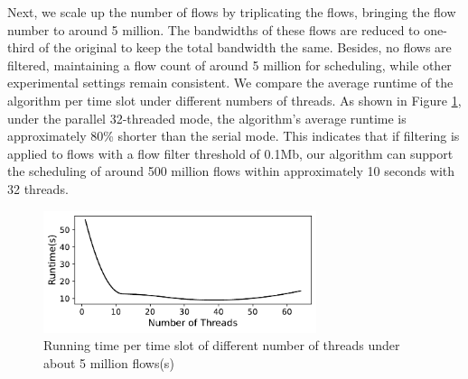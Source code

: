 Next, we scale up the number of flows by triplicating the flows, bringing the flow number to around 5 million. The bandwidths of these flows are reduced to one-third of the original to keep the total bandwidth the same. Besides, no flows are filtered, maintaining a flow count of around 5 million for scheduling, while other experimental settings remain consistent. We compare the average runtime of the algorithm per time slot under different numbers of threads. As shown in Figure \ref{fig:runtimeComp}, under the parallel 32-threaded mode, the algorithm's average runtime is approximately 80\% shorter than the serial mode. This indicates that if filtering is applied to flows with a flow filter threshold of 0.1Mb, our algorithm can support the scheduling of around 500 million flows within approximately 10 seconds with 32 threads.

\begin{figure}
	\centering
	\includegraphics[width = 8cm]{figs/evaluation/runtimeComp.pdf}
	\caption{\small Running time per time slot of different number of threads under about 5 million flows(s)}
	\label{fig:runtimeComp}
\end{figure}


